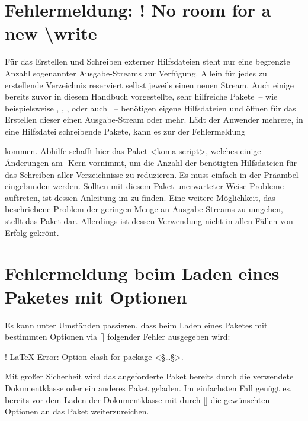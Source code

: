 \section{Fehlermeldung: ! No room for a new \textbackslash write}
%
Für das Erstellen und Schreiben externer Hilfsdateien steht  nur 
eine begrenzte Anzahl sogenannter Ausgabe-Streams zur Verfügung. Allein für 
jedes zu erstellende Verzeichnis reserviert  selbst jeweils einen 
neuen Stream. Auch einige bereits zuvor in diesem Handbuch vorgestellte, sehr 
hilfreiche Pakete~-- wie beispielsweise , , 
,  oder auch ~-- 
benötigen eigene Hilfsdateien und öffnen für das Erstellen dieser einen 
Ausgabe-Stream oder mehr. Lädt der Anwender mehrere, in eine Hilfsdatei 
schreibende Pakete, kann es zur der Fehlermeldung
%
\begin{quoting}
\end{quoting}
%
kommen. Abhilfe schafft hier das Paket <koma-script>, welches 
einige Änderungen am -Kern vornimmt, um die Anzahl der benötigten 
Hilfsdateien für das Schreiben aller Verzeichnisse zu reduzieren. Es muss 
einfach in der Präambel eingebunden werden. Sollten mit diesem Paket 
unerwarteter Weise Probleme auftreten, ist dessen Anleitung im \scrguide zu 
finden. Eine weitere Möglichkeit, das beschriebene Problem der geringen Menge 
an Ausgabe-Streams zu umgehen, stellt das Paket  dar. 
Allerdings ist dessen Verwendung nicht in allen Fällen von Erfolg gekrönt.



\section{Fehlermeldung beim Laden eines Paketes mit Optionen}
%
Es kann unter Umständen passieren, dass beim Laden eines Paketes mit bestimmten 
Optionen via [] 
folgender Fehler ausgegeben wird:
%
\begin{quoting}
\begin{Code}[escapechar=§]
! LaTeX Error: Option clash for package <§\dots§>.
\end{Code}
\end{quoting}
%
Mit großer Sicherheit wird das angeforderte Paket bereits durch die verwendete 
Dokumentklasse oder ein anderes Paket geladen. Im einfachsten Fall genügt es, 
bereits vor dem Laden der Dokumentklasse mit  durch 
[] die 
gewünschten Optionen an das Paket weiterzureichen.



